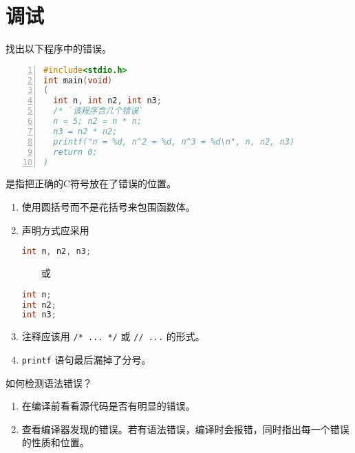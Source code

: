 \section{调试}
\begin{frame}[fragile]
找出以下程序中的错误。
\begin{lstlisting}[language=c,numbers=left,frame=tb]
#include<stdio.h>
int main(void) 
(
  int n, int n2, int n3;
  /* `该程序含几个错误`    
  n = 5; n2 = n * n;
  n3 = n2 * n2;
  printf("n = %d, n^2 = %d, n^3 = %d\n", n, n2, n3)      
  return 0;
)
\end{lstlisting}
\end{frame}

\begin{frame}[fragile]
\begin{defn}[]{} 
是指把正确的C符号放在了错误的位置。
\end{defn}\pause 

\begin{enumerate}
\item 使用圆括号而不是花括号来包围函数体。\\[0.1in]
\item 声明方式应采用

\begin{minipage}{0.4\linewidth}
\begin{lstlisting}[language=c,frame=single]
int n, n2, n3;
\end{lstlisting}
\end{minipage}
~~~~或~~~~
\begin{minipage}{0.4\linewidth}
\begin{lstlisting}[language=c,frame=single]
int n;
int n2;
int n3;
\end{lstlisting}
\end{minipage}
\item 注释应该用 \lstinline|/* ... */| 或 \lstinline|// ...| 的形式。\\[0.1in]
\item \lstinline|printf| 语句最后漏掉了分号。
\end{enumerate}
\end{frame}

\begin{frame}[fragile]
\begin{question}[]{}
如何检测语法错误？
\end{question}\pause 

\begin{enumerate}
\item 在编译前看看源代码是否有明显的错误。\\[0.1in]
\item 查看编译器发现的错误。若有语法错误，编译时会报错，同时指出每一个错误的性质和位置。
\end{enumerate}

\end{frame}


